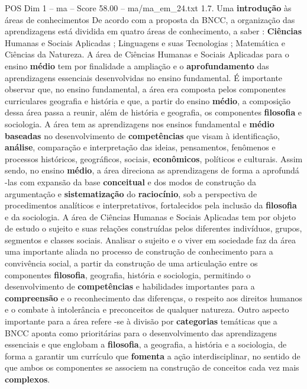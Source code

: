 \begin{textsample}{POS Dim 1 – ma – Score 58.00 – ma/ma\_em\_24.txt}  \label{ex:f1_pos_065}
1.7.
Uma \textbf{introdução} às áreas de conhecimentos De acordo com a proposta da BNCC, a organização das aprendizagens está dividida em quatro áreas de conhecimento, a saber : \textbf{Ciências} Humanas e Sociais Aplicadas ; Linguagens e suas Tecnologias ; Matemática e Ciências da Natureza.
A área de Ciências Humanas e Sociais Aplicadas para o ensino \textbf{médio} tem por finalidade a ampliação e o \textbf{aprofundamento} das aprendizagens essenciais desenvolvidas no ensino fundamental.
É importante observar que, no ensino fundamental, a área era composta pelos componentes curriculares geografia e história e que, a partir do ensino \textbf{médio}, a composição dessa área passa a reunir, além de história e geografia, os componentes \textbf{filosofia} e sociologia.
A área tem as aprendizagens nos ensinos fundamental e \textbf{médio} \textbf{baseadas} no desenvolvimento de \textbf{competências} que visam à identificação, \textbf{análise}, comparação e interpretação das ideias, pensamentos, fenômenos e processos históricos, geográficos, sociais, \textbf{econômicos}, políticos e culturais.
Assim sendo, no ensino \textbf{médio}, a área direciona as aprendizagens de forma a aprofundá -las com expansão da base \textbf{conceitual} e dos modos de construção da argumentação e \textbf{sistematização} do \textbf{raciocínio}, sob a perspectiva de procedimentos analíticos e interpretativos, fortalecidos pela inclusão da \textbf{filosofia} e da sociologia.
A área de Ciências Humanas e Sociais Aplicadas tem por objeto de estudo o sujeito e suas relações construídas pelos diferentes indivíduos, grupos, segmentos e classes sociais.
Analisar o sujeito e o viver em sociedade faz da área uma importante aliada no processo de construção de conhecimento para a convivência social, a partir da construção de uma articulação entre os componentes \textbf{filosofia}, geografia, história e sociologia, permitindo o desenvolvimento de \textbf{competências} e habilidades importantes para a \textbf{compreensão} e o reconhecimento das diferenças, o respeito aos direitos humanos e o combate à intolerância e preconceitos de qualquer natureza.
Outro aspecto importante para a área refere -se à divisão por \textbf{categorias} temáticas que a BNCC aponta como prioritárias para o desenvolvimento das aprendizagens essenciais e que englobam a \textbf{filosofia}, a geografia, a história e a sociologia, de forma a garantir um currículo que \textbf{fomenta} a ação interdisciplinar, no sentido de que ambos os componentes se associem na construção de conceitos cada vez mais \textbf{complexos}.

\end{textsample}

